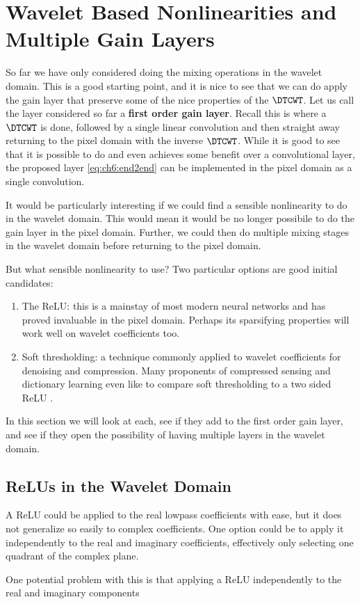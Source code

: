 \section{Wavelet Based Nonlinearities and Multiple Gain Layers}
So far we have only considered doing the mixing operations in the wavelet
domain. This is a good starting point, and it is nice to see that we can do
apply the gain layer that
preserve some of the nice properties of the $\DTCWT$. Let us call the layer
considered so far a \textbf{first order gain layer}. Recall this is where a
$\DTCWT$ is done, followed by a single linear convolution and then straight away
returning to the pixel domain with the inverse $\DTCWT$. While it is good to see
that it is possible to do and even achieves some benefit over a convolutional
layer, the proposed layer \eqref{eq:ch6:end2end} can be implemented in the pixel domain
as a single convolution.

It would be particularly interesting if we could find a sensible nonlinearity to
do in the wavelet domain. This would mean it would be no longer possibile to do the
gain layer in the pixel domain. Further, we could then do multiple mixing
stages in the wavelet domain before returning to the pixel domain.

But what sensible nonlinearity to use? Two particular options are good initial
candidates:
\begin{enumerate}
  \item The ReLU: this is a mainstay of most modern neural networks and has
    proved invaluable in the pixel domain. Perhaps its sparsifying properties
    will work well on wavelet coefficients too. 
  \item Soft thresholding: a technique commonly applied to wavelet
    coefficients for denoising and compression. Many proponents of compressed
    sensing and dictionary learning even like to compare soft thresholding to a
    two sided ReLU \cite{papyan_theoretical_2018, papyan_convolutional_2016}.
\end{enumerate}

In this section we will look at each, see if they add to the first order gain
layer, and see if they open the possibility of having multiple layers in the
wavelet domain. 

\subsection{ReLUs in the Wavelet Domain}
A ReLU could be applied to the real lowpass coefficients with ease, but it does
not generalize so easily to complex coefficients. One option could be to apply
it independently to the real and imaginary coefficients, effectively only
selecting one quadrant of the complex plane.

One potential problem with this is
that applying a ReLU independently to the real and imaginary components

